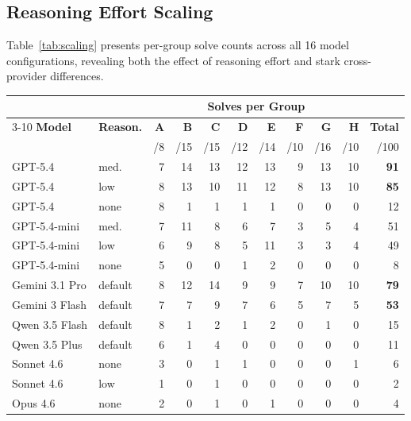 \documentclass[11pt]{article}
\begin{document}
\subsection{Reasoning Effort Scaling}
\label{sec:scaling}

Table~\ref{tab:scaling} presents per-group solve counts across all 16 model configurations, revealing both the effect of reasoning effort and stark cross-provider differences.

\begin{table}[t]
\centering
\small
\begin{tabular}{@{}ll rrrrrrrr r@{}}
\toprule
& & \multicolumn{8}{c}{\textbf{Solves per Group}} & \\
\cmidrule(lr){3-10}
\textbf{Model} & \textbf{Reason.} & \textbf{A} & \textbf{B} & \textbf{C} & \textbf{D} & \textbf{E} & \textbf{F} & \textbf{G} & \textbf{H} & \textbf{Total} \\
& & \tiny{/8} & \tiny{/15} & \tiny{/15} & \tiny{/12} & \tiny{/14} & \tiny{/10} & \tiny{/16} & \tiny{/10} & \tiny{/100} \\
\midrule
GPT-5.4          & med.    & 7 & 14 & 13 & 12 & 13 & 9 & 13 & 10 & \textbf{91} \\
GPT-5.4          & low     & 8 & 13 & 10 & 11 & 12 & 8 & 13 & 10 & \textbf{85} \\
GPT-5.4          & none    & 8 &  1 &  1 &  1 &  1 & 0 &  0 &  0 & 12 \\
GPT-5.4-mini     & med.    & 7 & 11 &  8 &  6 &  7 & 3 &  5 &  4 & 51 \\
GPT-5.4-mini     & low     & 6 &  9 &  8 &  5 & 11 & 3 &  3 &  4 & 49 \\
GPT-5.4-mini     & none    & 5 &  0 &  0 &  1 &  2 & 0 &  0 &  0 &  8 \\
\midrule
Gemini 3.1 Pro   & default & 8 & 12 & 14 &  9 &  9 & 7 & 10 & 10 & \textbf{79} \\
Gemini 3 Flash   & default & 7 &  7 &  9 &  7 &  6 & 5 &  7 &  5 & \textbf{53} \\
\midrule
Qwen 3.5 Flash   & default & 8 &  1 &  2 &  1 &  2 & 0 &  1 &  0 & 15 \\
Qwen 3.5 Plus    & default & 6 &  1 &  4 &  0 &  0 & 0 &  0 &  0 & 11 \\
\midrule
Sonnet 4.6       & none    & 3 &  0 &  1 &  1 &  0 & 0 &  0 &  1 &  6 \\
Sonnet 4.6       & low     & 1 &  0 &  1 &  0 &  0 & 0 &  0 &  0 &  2 \\
Opus 4.6         & none    & 2 &  0 &  1 &  0 &  1 & 0 &  0 &  0 &  4 \\

\end{tabular}
\end{table}
\end{document}
